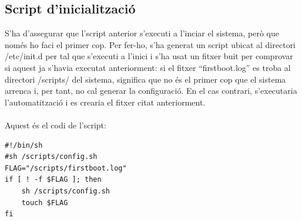 \documentclass[11pt]{article}
\begin{document}
\subsection{Script d’inicialització}
S’ha d’assegurar que l’script anterior s’executi a l’inciar el sistema, però que només ho faci el primer cop. Per fer-ho, s’ha generat un script ubicat al directori /etc/init.d per tal que s’executi a l’inici i s’ha usat un fitxer buit per comprovar si aquest ja s’havia executat anteriorment: si el fitxer “firstboot.log” es troba al directori /scripts/ del sistema, significa que no és el primer cop que el sistema arrenca i, per tant, no cal generar la configuració. En el cas contrari, s’executaria l’automatització i es crearia el fitxer citat anteriorment.\\
\\
Aquest és el codi de l’script:\\
\lstset{language=sh, caption=Script per executar l'automatització només una vegada}
\begin{lstlisting}[frame=single]
#!/bin/sh
#sh /scripts/config.sh
FLAG="/scripts/firstboot.log"
if [ ! -f $FLAG ]; then
    sh /scripts/config.sh
    touch $FLAG
fi
\end{lstlisting}
\end{document}
